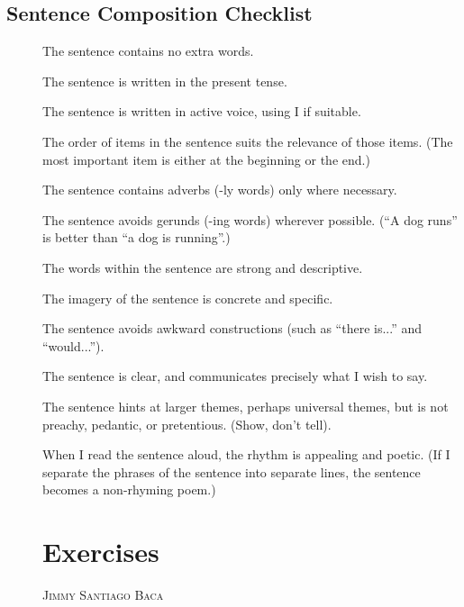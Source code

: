 \documentclass[letterpaper,oneside]{memoir}
\begin{document}
\newpage
\section{Sentence Composition Checklist}
\begin{description}
\item [\boxempty] The sentence contains no extra words.

\item [\boxempty] The sentence is written in the present tense.

\item [\boxempty] The sentence is written in active voice, using I if suitable.

\item [\boxempty] The order of items in the sentence suits the relevance of those items.
	(The most important item is either at the beginning or the end.)

\item [\boxempty] The sentence contains adverbs (-ly words) only where necessary.

\item [\boxempty] The sentence avoids gerunds (-ing words) wherever possible.
	(``A dog runs'' is better than ``a dog is running''.)

\item [\boxempty] The words within the sentence are strong and descriptive.

\item [\boxempty] The imagery of the sentence is concrete and specific.

\item [\boxempty] The sentence avoids awkward constructions (such as ``there is...'' and ``would...'').

\item [\boxempty] The sentence is clear, and communicates precisely what I wish to say.

\item [\boxempty] The sentence hints at larger themes, perhaps universal themes, 
	but is not preachy, pedantic, or pretentious. (Show, don't tell).

\item [\boxempty] When I read the sentence aloud, the rhythm is appealing and poetic.
	(If I separate the phrases of the sentence into separate lines, 
	the sentence becomes a non-rhyming poem.)



\newpage
\chapter{Exercises}
\begin{epigraphs}
{\textsc{Jimmy Santiago Baca}}
\end{epigraphs}
\newpage

\end{description}
\end{document}
